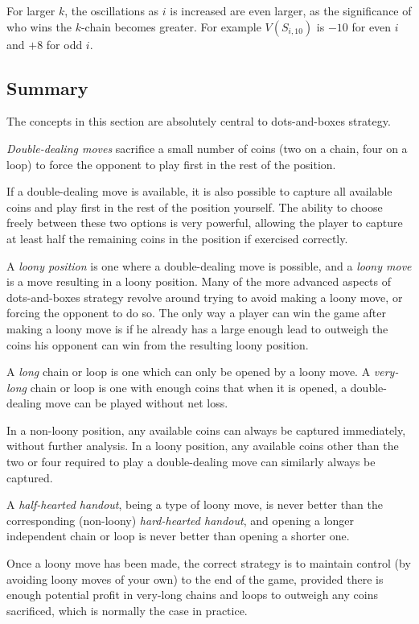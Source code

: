 \documentclass[a4paper,twocolumn]{article}
\begin{document}
For larger $k$, the oscillations as $i$ is increased are even larger,
as the significance of who wins the $k$-chain becomes greater. For
example $V(S_{i,10})$ is $-10$ for even $i$ and $+8$ for odd $i$.

\subsection{Summary}

The concepts in this section are absolutely central to dots-and-boxes
strategy.

\emph{Double-dealing moves} sacrifice a small number of coins (two on
a chain, four on a loop) to force the opponent to play first in the
rest of the position.

If a double-dealing move is available, it is also possible to capture
all available coins and play first in the rest of the position
yourself. The ability to choose freely between these two options is
very powerful, allowing the player to capture at least half the
remaining coins in the position if exercised correctly.

A \emph{loony position} is one where a double-dealing move is
possible, and a \emph{loony move} is a move resulting in a loony
position. Many of the more advanced aspects of dots-and-boxes strategy
revolve around trying to avoid making a loony move, or forcing the
opponent to do so. The only way a player can win the game after making
a loony move is if he already has a large enough lead to outweigh the
coins his opponent can win from the resulting loony position.

A \emph{long} chain or loop is one which can only be opened by a loony
move. A \emph{very-long} chain or loop is one with enough coins that
when it is opened, a double-dealing move can be played without net
loss.

In a non-loony position, any available coins can always be captured
immediately, without further analysis. In a loony position, any
available coins other than the two or four required to play a
double-dealing move can similarly always be captured.

A \emph{half-hearted handout}, being a type of loony move, is never
better than the corresponding (non-loony) \emph{hard-hearted handout},
and opening a longer independent chain or loop is never better than
opening a shorter one.

Once a loony move has been made, the correct strategy is to maintain
control (by avoiding loony moves of your own) to the end of the game,
provided there is enough potential profit in very-long chains and
loops to outweigh any coins sacrificed, which is normally the case in
practice.
\end{document}
